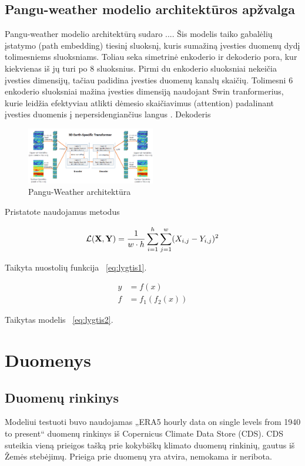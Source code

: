 \documentclass[conference]{IEEEtran}
\begin{document}
\subsection{Pangu-weather modelio architektūros apžvalga}

Pangu-weather modelio architektūrą sudaro .... Šis modelis taiko gabalėlių įstatymo (path embedding) tiesinį sluoksnį, kuris sumažiną įvesties duomenų dydį tolimesniems sluoksniams. Toliau seka simetrinė enkoderio ir dekoderio pora, kur kiekvienas iš jų turi po 8 sluoksnius. Pirmi du enkoderio sluoksniai nekeičia įvesties dimensijų, tačiau padidina įvesties duomenų kanalų skaičių. Tolimesni 6 enkoderio sluoksniai mažina įvesties dimensiją naudojant Swin tranformerius, kurie leidžia efektyviau atlikti dėmesio skaičiavimus (attention) padalinant įvesties duomenis į nepersidengiančius langus \cite{liu2021swin}. Dekoderis

\begin{figure}[htb!] %
\centerline{\includegraphics[width=0.5\textwidth]{img/pangu-weather-architecture.png}}
\caption{Pangu-Weather architektūra}
\label{fig1}
\end{figure}

Pristatote naudojamus metodus

\begin{equation}
\mathcal{L}({\bf X}, {\bf Y}) = \frac{1}{w \cdot h} \sum_{i=1}^h \sum_{j=1}^w (X_{i, j} - Y_{i, j})^2
\label{eq:lygtis1}
\end{equation}

Taikyta nuostolių funkcija ~\eqref{eq:lygtis1}.

\begin{align}
y & = f(x) \nonumber \\
f & = f_1(f_2(x))
\label{eq:lygtis2}
\end{align}

Taikytas modelis ~\eqref{eq:lygtis2}.


\section{Duomenys}

\subsection{Duomenų rinkinys}
Modeliui testuoti buvo naudojamas „ERA5 hourly data on single levels from 1940 to present“ duomenų rinkinys iš Copernicus Climate Data Store (CDS). CDS suteikia vieną prieigos tašką prie kokybiškų klimato duomenų rinkinių, gautus iš Žemės stebėjimų. Prieiga prie duomenų yra atvira, nemokama ir neribota. 
\end{document}

